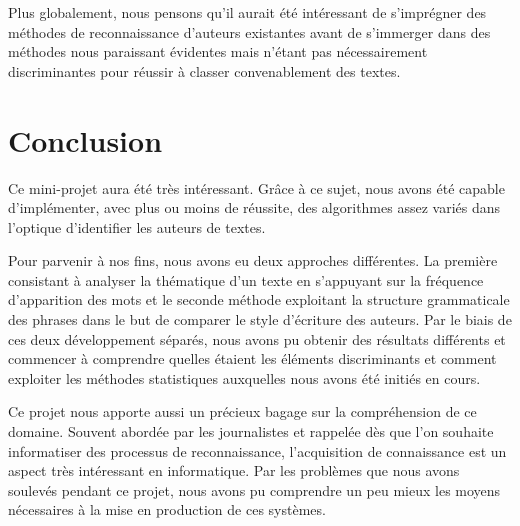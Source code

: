 \documentclass[a4paper,12pt]{report}
\begin{document}
Plus globalement, nous pensons qu'il aurait été intéressant de s'imprégner des méthodes de reconnaissance d'auteurs existantes avant de s'immerger dans des méthodes nous paraissant évidentes mais n'étant pas nécessairement discriminantes pour réussir à classer convenablement des textes.




\section*{Conclusion}

Ce mini-projet aura été très intéressant. Grâce à ce sujet, nous avons été capable d'implémenter, avec plus ou moins de réussite, des algorithmes assez variés dans l'optique d'identifier les auteurs de textes.

Pour parvenir à nos fins, nous avons eu deux approches différentes. La première consistant à analyser la thématique d'un texte en s'appuyant sur la fréquence d'apparition des mots et le seconde méthode exploitant la structure grammaticale des phrases dans le but de comparer le style d'écriture des auteurs. Par le biais de ces deux développement séparés, nous avons pu obtenir des résultats différents et commencer à comprendre quelles étaient les éléments discriminants et comment exploiter les méthodes statistiques auxquelles nous avons été initiés en cours.

Ce projet nous apporte aussi un précieux bagage sur la compréhension de ce domaine. Souvent abordée par les journalistes et rappelée dès que l'on souhaite informatiser des processus de reconnaissance, l'acquisition de connaissance est un aspect très intéressant en informatique. Par les problèmes que nous avons soulevés pendant ce projet, nous avons pu comprendre un peu mieux les moyens nécessaires à la mise en production de ces systèmes.
\end{document}
